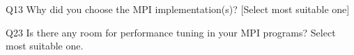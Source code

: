 \begin{description}%
\item{Q13} Why did you choose the MPI implementation(s)? [Select most suitable one]%
\item{Q23} Is there any room for performance tuning in your MPI programs? Select most suitable one.%
\end{description}%
